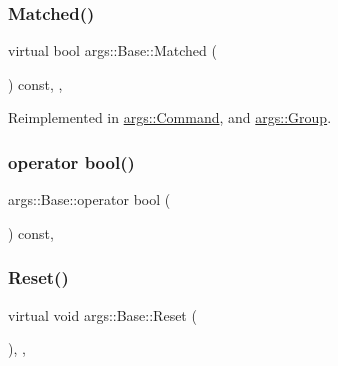 \mbox{\label{classargs_1_1_base_ae7ae4ca8ad953be1a353991c1df6ec4d}} 
\subsubsection{\texorpdfstring{Matched()}{Matched()}}
{\footnotesize\ttfamily virtual bool args\+::\+Base\+::\+Matched (\begin{DoxyParamCaption}{ }\end{DoxyParamCaption}) const\hspace{0.3cm}{\ttfamily [inline]}, {\ttfamily [virtual]}, {\ttfamily [noexcept]}}



Reimplemented in \hyperlink{classargs_1_1_command_aebb9c512301e7f0c49689ed92568ef6e}{args\+::\+Command}, and \hyperlink{classargs_1_1_group_a7794d31edae97254be440b8768db9af0}{args\+::\+Group}.

\mbox{\label{classargs_1_1_base_ad356e2bd5711e86d005bdc7c483a347e}} 
\subsubsection{\texorpdfstring{operator bool()}{operator bool()}}
{\footnotesize\ttfamily args\+::\+Base\+::operator bool (\begin{DoxyParamCaption}{ }\end{DoxyParamCaption}) const\hspace{0.3cm}{\ttfamily [inline]}, {\ttfamily [noexcept]}}

\mbox{\label{classargs_1_1_base_ac7cfc851174f71e00173121d3013dab1}} 
\subsubsection{\texorpdfstring{Reset()}{Reset()}}
{\footnotesize\ttfamily virtual void args\+::\+Base\+::\+Reset (\begin{DoxyParamCaption}{ }\end{DoxyParamCaption})\hspace{0.3cm}{\ttfamily [inline]}, {\ttfamily [virtual]}, {\ttfamily [noexcept]}}



